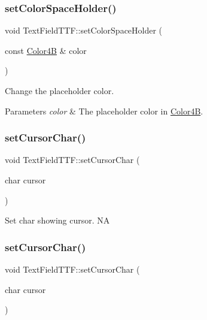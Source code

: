 \subsubsection{\texorpdfstring{set\+Color\+Space\+Holder()}{setColorSpaceHolder()}\hspace{0.1cm}{\footnotesize\ttfamily [4/4]}}
{\footnotesize\ttfamily void Text\+Field\+T\+T\+F\+::set\+Color\+Space\+Holder (\begin{DoxyParamCaption}\item[{const \hyperlink{structColor4B}{Color4B} \&}]{color }\end{DoxyParamCaption})\hspace{0.3cm}{\ttfamily [virtual]}}

Change the placeholder color. 
\begin{DoxyParams}{Parameters}
{\em color} & The placeholder color in \hyperlink{structColor4B}{Color4B}. \\
\hline
\end{DoxyParams}
\mbox{\label{classTextFieldTTF_ac638fa956caa6e3a3538b323b71cc23f}} 
\subsubsection{\texorpdfstring{set\+Cursor\+Char()}{setCursorChar()}\hspace{0.1cm}{\footnotesize\ttfamily [1/2]}}
{\footnotesize\ttfamily void Text\+Field\+T\+T\+F\+::set\+Cursor\+Char (\begin{DoxyParamCaption}\item[{char}]{cursor }\end{DoxyParamCaption})}

Set char showing cursor.  NA \mbox{\label{classTextFieldTTF_ac638fa956caa6e3a3538b323b71cc23f}} 
\subsubsection{\texorpdfstring{set\+Cursor\+Char()}{setCursorChar()}\hspace{0.1cm}{\footnotesize\ttfamily [2/2]}}
{\footnotesize\ttfamily void Text\+Field\+T\+T\+F\+::set\+Cursor\+Char (\begin{DoxyParamCaption}\item[{char}]{cursor }\end{DoxyParamCaption})}

